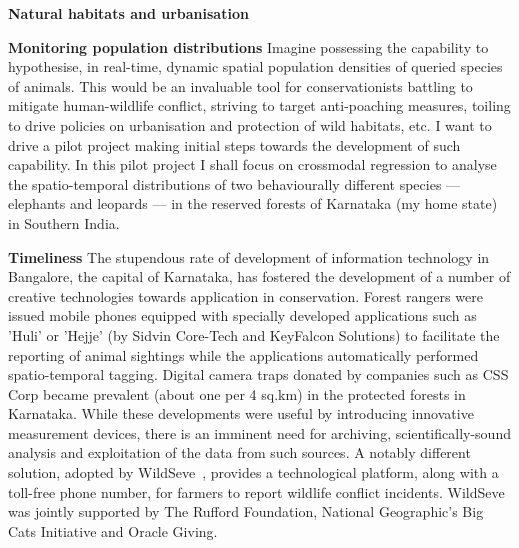 \documentclass[a4paper,10pt,twocolumn]{article}
\newcommand{\hdg}[1] {\noindent \textbf{#1} }
\begin{document}
{ 
\Large 
{}%
}


\hdg{Natural habitats and urbanisation}

\hdg{Monitoring population distributions}
Imagine possessing the capability to hypothesise, in real-time, dynamic spatial population densities of queried species of animals. This would be an invaluable tool for conservationists battling to mitigate human-wildlife conflict, striving to target anti-poaching measures, toiling to drive policies on urbanisation and protection of wild habitats, etc. I want to drive a pilot project making initial steps towards the development of such capability. In this pilot project I shall focus on crossmodal regression to analyse the spatio-temporal distributions of two behaviourally different species --- elephants and leopards --- in the reserved forests of Karnataka (my home state) in Southern India.


\hdg{Timeliness}
The stupendous rate of development of information technology in Bangalore, the capital of Karnataka, has fostered the development of a number of creative technologies towards application in conservation. Forest rangers were issued mobile phones equipped with specially developed applications such as 'Huli' or 'Hejje' (by Sidvin Core-Tech and KeyFalcon Solutions) to facilitate the reporting of animal sightings while the applications automatically performed spatio-temporal tagging. Digital camera traps donated by companies such as CSS Corp became prevalent (about one per 4 sq.km) in the protected forests in Karnataka. While these developments were useful by introducing innovative measurement devices, there is an imminent need for archiving, scientifically-sound analysis and exploitation of the data from such sources. A notably different solution, adopted by WildSeve~\cite{}, provides a technological platform, along with a toll-free phone number, for farmers to report wildlife conflict incidents. WildSeve was jointly supported by The Rufford Foundation, National Geographic's Big Cats Initiative and Oracle Giving.
\end{document}
